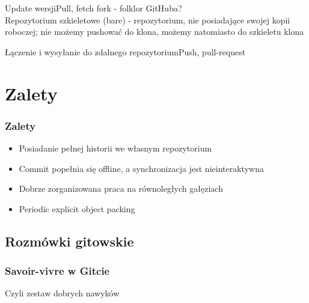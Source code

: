 \documentclass{beamer}
\begin{document}
\begin{frame}{Update wersji}{Pull, fetch}
  fork - folklor GitHuba?\\
  Repozytorium szkieletowe (bare) - repozytorium, nie posiadające swojej kopii roboczej; nie możemy pushować do klona, 
  możemy natomiasto do szkieletu klona

\end{frame}

\begin{frame}{Łączenie i wysyłanie do zdalnego repozytorium}{Push, pull-request}

\end{frame}

\section{Zalety}

\begin{frame}
\frametitle{Zalety}
\begin{itemize}
 \item Posiadanie pełnej historii we własnym repozytorium
 \item Commit popełnia się offline, a synchronizacja jest nieinteraktywna
 \item Dobrze zorganizowana praca na równoległych gałęziach
 \item Periodic explicit object packing
\end{itemize}
 
\end{frame}

\subsection{Rozmówki gitowskie}
\begin{frame}
 \frametitle{Savoir-vivre w Gitcie}{Czyli zestaw dobrych nawyków}
\end{frame}
\end{document}
